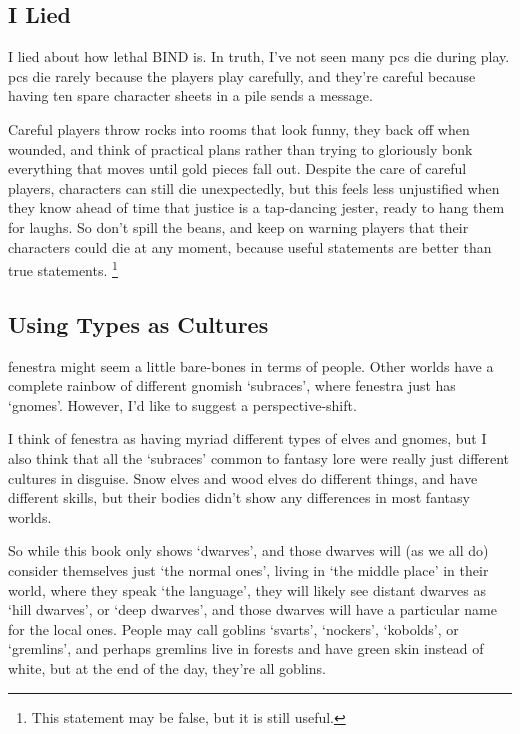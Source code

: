 \begin{multicols}{2}
\subsection{I Lied}
I lied about how lethal BIND is.
In truth, I've not seen many \glspl{pc} die during play.
\Glspl{pc} die rarely because the players play carefully, and they're careful because having ten spare character sheets in a pile sends a message.

Careful players throw rocks into rooms that look funny, they back off when wounded, and think of practical plans rather than trying to gloriously bonk everything that moves until gold pieces fall out.
Despite the care of careful players, characters can still die unexpectedly, but this feels less unjustified when they know ahead of time that justice is a tap-dancing jester, ready to hang them for laughs.
So don't spill the beans, and keep on warning players that their characters could die at any moment, because useful statements are better than true statements.%
\footnote{This statement may be false, but it is still useful.}

\subsection{Using Types as Cultures}

\Gls{fenestra} might seem a little bare-bones in terms of people.
Other worlds have a complete rainbow of different gnomish `subraces', where \gls{fenestra} just has `gnomes'.
However, I'd like to suggest a perspective-shift.

I think of \gls{fenestra} as having myriad different types of elves and gnomes, but I also think that all the `subraces' common to fantasy lore were really just different cultures in disguise.
Snow elves and wood elves do different things, and have different skills, but their bodies didn't show any differences in most fantasy worlds.

So while this book only shows `dwarves', and those dwarves will (as we all do) consider themselves just `the normal ones', living in `the middle place' in their world, where they speak `the language', they will likely see distant dwarves as `hill dwarves', or `deep dwarves', and those dwarves will have a particular name for the local ones.
People may call goblins `svarts', `nockers', `kobolds', or `gremlins', and perhaps gremlins live in forests and have green skin instead of white, but at the end of the day, they're all goblins.


\end{multicols}
